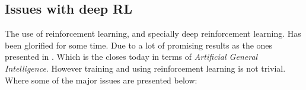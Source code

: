 \documentclass{kththesis}
\theoremstyle{definition}
\begin{document}


\newpage

\subsection{Issues with deep RL}
The use of reinforcement learning, and specially deep reinforcement learning. Has been glorified for some time. Due to a lot of promising results as the ones presented in \textcite{silver2016mastering, silver2017mastering}. Which is the closes today in terms of \textit{Artificial General Intelligence}. However training and using reinforcement learning is not trivial. Where some of the major issues are presented below:
\end{document}
